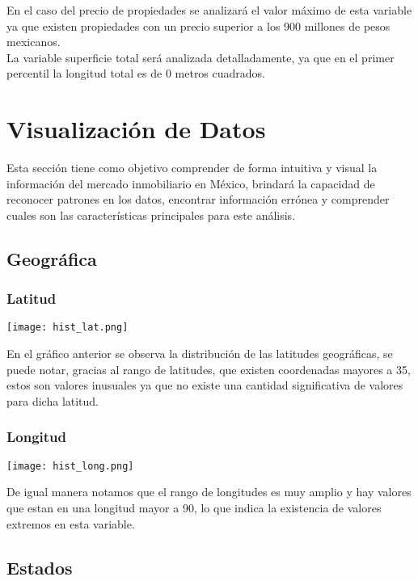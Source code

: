 \documentclass{report}
\begin{document}
En el caso del precio de propiedades se analizará el valor máximo de esta variable ya que existen propiedades con un precio superior a los 900 millones de pesos mexicanos.\\

La variable superficie total será analizada detalladamente, ya que en el primer percentil la longitud total es de 0 metros cuadrados.\\
    
    \section{Visualización de Datos}
    Esta sección tiene como objetivo comprender de forma intuitiva y visual la información del mercado inmobiliario en México, brindará la capacidad de reconocer patrones en los datos, encontrar información errónea y comprender cuales son las características principales para este análisis.
    
        \subsection{Geográfica}
            \subsubsection{Latitud}
            \begin{center}
                \texttt{[image: hist\_lat.png]}
            \end{center}
                En el gráfico anterior se observa la distribución de las latitudes geográficas, se puede notar, gracias al rango de latitudes, que existen coordenadas mayores a 35, estos son valores inusuales ya que no existe una cantidad significativa de valores para dicha latitud.
                
            \subsubsection{Longitud}
            \begin{center}
                \texttt{[image: hist\_long.png]}
            \end{center}
                De igual manera notamos que el rango de longitudes es muy amplio y hay valores que estan en una longitud mayor a 90, lo que indica la existencia de valores extremos en esta variable.
            
        \subsection{Estados}
\end{document}
